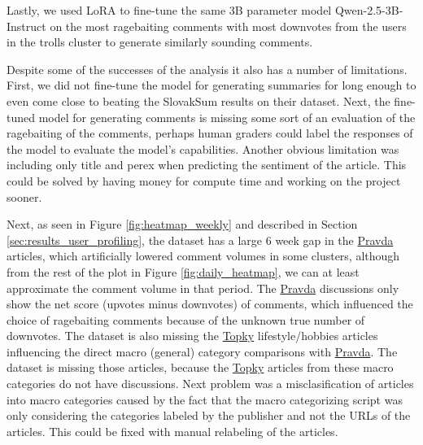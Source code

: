 \documentclass[11pt,a4paper]{article}
\def\topky{\href{https://topky.sk}{Topky}}
\def\pravda{\href{https://pravda.sk}{Pravda}}
\begin{document}
Lastly, we used LoRA \cite{Hu2021} to fine-tune the same 3B parameter model Qwen-2.5-3B-Instruct \cite{Yang2024} on the most ragebaiting comments with most downvotes from the users in the trolls cluster to generate similarly sounding comments.

Despite some of the successes of the analysis it also has a number of limitations. First, we did not fine-tune the model for generating summaries for long enough to even come close to beating the SlovakSum \cite{Ondrejova2024} results on their dataset. Next, the fine-tuned model for generating comments is missing some sort of an evaluation of the ragebaiting of the comments, perhaps human graders could label the responses of the model to evaluate the model's capabilities. Another obvious limitation was including only title and perex when predicting the sentiment of the article. This could be solved by having money for compute time and working on the project sooner.

Next, as seen in Figure \ref{fig:heatmap_weekly} and described in Section \ref{sec:results_user_profiling}, the dataset has a large 6 week gap in the \pravda{} articles, which artificially lowered comment volumes in some clusters, although from the rest of the plot in Figure \ref{fig:daily_heatmap}, we can at least approximate the comment volume in that period. The \pravda{} discussions only show the net score (upvotes minus downvotes) of comments, which influenced the choice of ragebaiting comments because of the unknown true number of downvotes. The dataset is also missing the \topky{} lifestyle/hobbies articles influencing the direct macro (general) category comparisons with \pravda{}. The dataset is missing those articles, because the \topky{} articles from these macro categories do not have discussions. Next problem was a misclasification of articles into macro categories caused by the fact that the macro categorizing script was only considering the categories labeled by the publisher and not the URLs of the articles. This could be fixed with manual relabeling of the articles.
\end{document}
